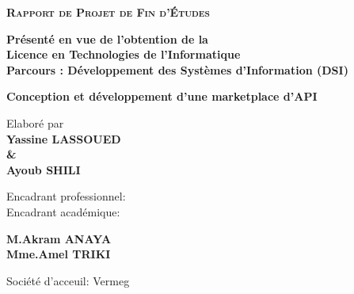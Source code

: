 \begin{center}
{\LARGE{\textbf{\textsc{Rapport de Projet de Fin d'\'Etudes}}}}\\
\vskip0.5cm
\large

{\textbf{Présenté en vue de l'obtention de la}}\\
\vskip2mm
{\textbf{Licence en Technologies de l’Informatique}}\\
{\textbf{Parcours : Développement des Systèmes d'Information (DSI)}}\\
{}
\end{center}
\vskip8mm%
\begin{center}

\begin{changemargin}{-9mm}{0cm}
\begin{minipage}[l]{1.1\columnwidth}
\begin{tcolorbox}[colframe=isiBlue,colback=white,boxrule=0pt,toprule=3pt,bottomrule=3pt,arc=0pt,top=0mm,right=0mm,left=0mm,bottom=0mm,boxsep=0.5mm]{
    \begin{tcolorbox}[colframe=isiBlue,colback=white, boxrule=0pt,toprule=1pt,bottomrule=1pt,arc=0pt,enlarge bottom by=-0.9mm, auto outer arc]
        \centering
        {\huge\textbf{Conception et  développement d'une marketplace d'API}}
    \end{tcolorbox}
}
\end{tcolorbox}
\end{minipage}
\end{changemargin}
\vskip8mm%
\textrm{Elaboré par}\\
\textbf{ \Large Yassine LASSOUED } \\
\textbf{\Large \&} \\
\textbf{\Large Ayoub SHILI} \\
\vskip12mm




\end{center}
\vskip8mm%

\begin{center}
\large
\begin{minipage}[c]{0.28\columnwidth}
Encadrant professionnel:\\
Encadrant académique:
\end{minipage}
\hfill
\begin{minipage}[c]{0.42\columnwidth}
\textbf{M.Akram ANAYA}\\
\textbf{Mme.Amel TRIKI}
\end{minipage}
\hfill
\begin{minipage}[c]{0.26\columnwidth}

\end{minipage}
\end{center}
\vskip16mm

\begin{center}
\large
Société d'acceuil: Vermeg\\

\end{center}

\afterpage{\blankpage}